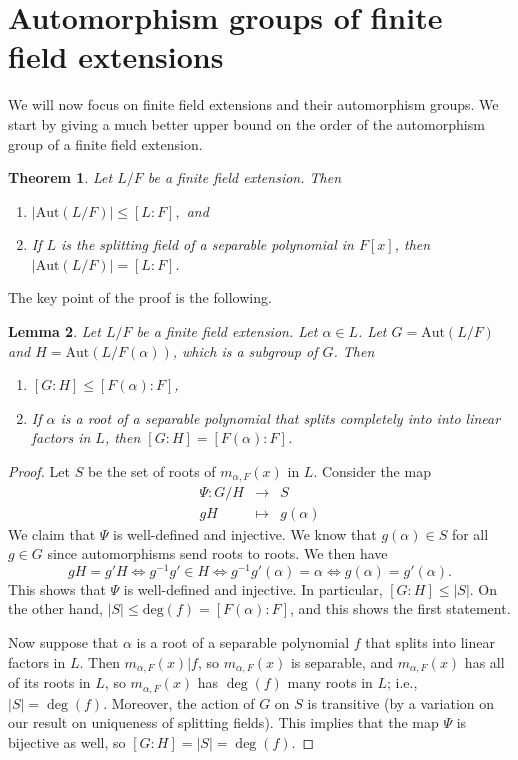 \documentclass[12pt]{report}
\newtheorem{theorem}{Theorem}[chapter]
\newtheorem{lemma}[theorem]{Lemma}
\numberwithin{equation}{section}
\numberwithin{theorem}{chapter}
\theoremstyle{definition}
\newtheorem*{basic properties}{Basic Properties}
\newtheorem*{Important Remark}{Important Remark}
\begin{document}
\section{Automorphism groups of finite field extensions}


We will now focus on finite field extensions and their automorphism groups. We start by giving a much better upper bound on the order of the automorphism group of a finite field extension.


\begin{theorem}\label{order Galois group}
Let $L/F$ be a finite field extension. Then
\begin{enumerate}
\item $|\mathrm{Aut}(L/F)| \leqslant [L : F],$ and
\item If $L$ is the splitting field of a separable polynomial in $F[x]$, then $|\mathrm{Aut}(L/F)| = [L : F].$
\end{enumerate}
\end{theorem}

The key point of the proof is the following.

\begin{lemma}
Let $L/F$ be a finite field extension. Let $\alpha\in L$. Let $G=\mathrm{Aut}(L/F)$ and $H=\mathrm{Aut}(L/F(\alpha))$, which is a subgroup of $G$. Then
\begin{enumerate}
\item $[G:H]\leq [F(\alpha):F]$, 
\item If $\alpha$ is a root of a separable polynomial that splits completely into into linear factors in $L$, then $[G:H]=  [F(\alpha):F]$.
\end{enumerate}
\end{lemma}
\begin{proof} Let $S$ be the set of roots of $m_{\alpha,F}(x)$ in $L$. 
 Consider the map 
 \[ \begin{aligned} \Psi: G/H &\rightarrow & S \\
 gH & \mapsto & g(\alpha) \end{aligned}\]
We claim that $\Psi$ is well-defined and injective. We know that $g(\alpha)\in S$ for all $g\in G$ since automorphisms send roots to roots.
We then have
\[ gH=g'H \Leftrightarrow g^{-1}g' \in H \Leftrightarrow g^{-1}g'(\alpha) = \alpha  \Leftrightarrow g(\alpha) = g'(\alpha).\]
This shows that $\Psi$ is well-defined and injective. In particular, $[G:H]\leq |S|$. On the other hand, $|S|\leq \mathrm{deg}(f)=  [F(\alpha):F]$, and this shows the first statement.

Now suppose that $\alpha$ is a root of a separable polynomial $f$ that splits into linear factors in $L$. Then $m_{\alpha,F}(x) | f$, so $m_{\alpha,F}(x)$ is separable, and $m_{\alpha,F}(x)$ has all of its roots in $L$, so $m_{\alpha,F}(x)$ has $\deg(f)$ many roots in $L$; i.e., $|S|=\deg(f)$. Moreover, the action of $G$ on $S$ is transitive (by a variation on our result on uniqueness of splitting fields). This implies that the map $\Psi$ is bijective as well, so $[G:H]= |S|=\deg(f)$.
 \end{proof}
 
\end{document}
